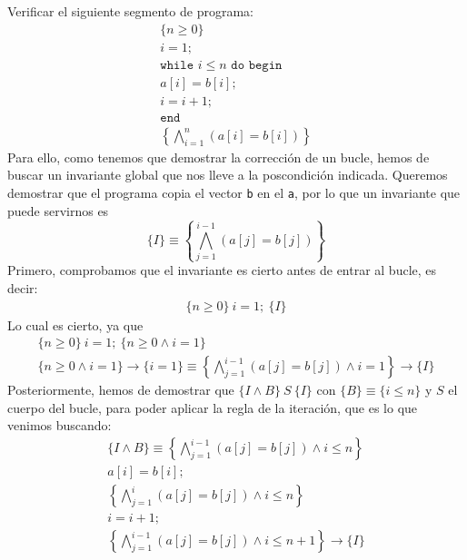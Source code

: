 \begin{ejercicio}
    Verificar el siguiente segmento de programa:
    \begin{gather*}
        \{n\geq 0\}\\ 
        i = 1;\\
        \texttt{while\ } i\leq n \texttt{\ do\ begin}\\
        a[i] = b[i]; \\
        i=i+1;\\
        \texttt{end} \\
        \left\{\bigwedge_{i=1}^n (a[i]=b[i])\right\}
    \end{gather*}
    Para ello, como tenemos que demostrar la corrección de un bucle, hemos de buscar un invariante global que nos lleve a la poscondición indicada. Queremos demostrar que el programa copia el vector \verb|b| en el \verb|a|, por lo que un invariante que puede servirnos es
    \begin{equation*}
        \{I\} \equiv \left\{\bigwedge_{j=1}^{i-1}(a[j] = b[j])\right\}
    \end{equation*}
    Primero, comprobamos que el invariante es cierto antes de entrar al bucle, es decir:
    \begin{gather*}
        \{n\geq 0\}\ i = 1;\ \{I\}
    \end{gather*}
    Lo cual es cierto, ya que
    \begin{gather*}
        \{n\geq 0\}\ i = 1;\ \{n\geq 0 \land i = 1\}\\ 
        \{n\geq 0 \land i = 1\}\rightarrow \{i=1\} \equiv \left\{\bigwedge_{j=1}^{i-1}(a[j] = b[j]) \land i = 1\right\} \rightarrow \{I\}
    \end{gather*}
    Posteriormente, hemos de demostrar que $\{I \land B\}\ S\ \{I\}$ con $\{B\} \equiv \{i \leq n\}$ y $S$ el cuerpo del bucle, para poder aplicar la regla de la iteración, que es lo que venimos buscando:
    \begin{gather*}
        \{I \land B\} \equiv \left\{\bigwedge_{j=1}^{i-1}(a[j]=b[j]) \land i\leq n\right\} \\
        a[i] = b[i]; \\
        \left\{\bigwedge_{j=1}^{i}(a[j]=b[j]) \land i\leq n\right\} \\
        i = i + 1; \\
        \left\{\bigwedge_{j=1}^{i-1}(a[j]=b[j]) \land i\leq n+1\right\} \rightarrow \{I\}
    \end{gather*}

\end{ejercicio}
